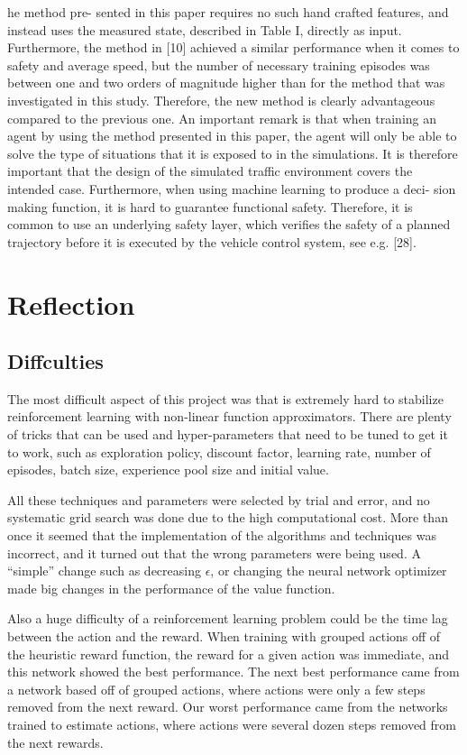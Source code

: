 he method pre- sented in this paper requires no such hand crafted features, and instead uses the measured state, described in Table I, directly as input. Furthermore, the method in [10] achieved a similar performance when it comes to safety and average speed, but the number of necessary training episodes was between one and two orders of magnitude higher than for the method that was investigated in this study. Therefore, the new method is clearly advantageous compared to the previous one.
An important remark is that when training an agent by using the method presented in this paper, the agent will only be able to solve the type of situations that it is exposed to in the simulations. It is therefore important that the design of the simulated traffic environment covers the intended case. Furthermore, when using machine learning to produce a deci- sion making function, it is hard to guarantee functional safety. Therefore, it is common to use an underlying safety layer, which verifies the safety of a planned trajectory before it is executed by the vehicle control system, see e.g. [28].

\section{Reflection}

\subsection{Diffculties}

The most difficult aspect of this project was that is extremely hard to stabilize reinforcement learning with non-linear function approximators. There are plenty of tricks that can be used and hyper-parameters that need to be tuned to get it to work, such as exploration policy, discount factor, learning rate, number of episodes, batch size, experience pool size and initial value.

All these techniques and parameters were selected by trial and error, and no systematic grid search was done due to the high computational cost. More than once it seemed that the implementation of the algorithms and techniques was incorrect, and it turned out that the wrong parameters were being used. A ``simple'' change such as decreasing $\epsilon$, or changing the neural network optimizer made big changes in the performance of the value function.

Also a huge difficulty of a reinforcement learning problem could be the time lag between the action and the reward. When training with grouped actions off of the heuristic reward function, the reward for a given action was immediate, and this network showed the best performance. The next best performance came from a network based off of grouped actions, where actions were only a few steps removed from the next reward. Our worst performance came from the networks trained to estimate actions, where actions were several dozen steps removed from the next rewards.

